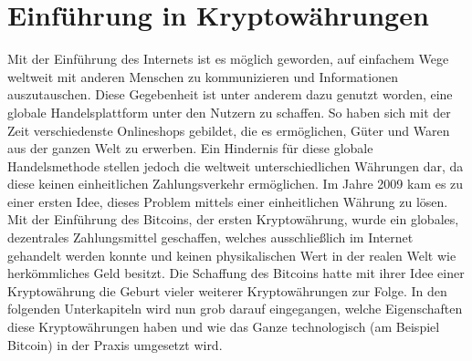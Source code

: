 \documentclass[12pt]{article}
\begin{document}
\part{Einführung in Kryptowährungen}
Mit der Einführung des Internets ist es möglich geworden, auf einfachem Wege weltweit mit anderen Menschen zu kommunizieren und Informationen auszutauschen. Diese Gegebenheit ist unter anderem dazu genutzt worden, eine globale Handelsplattform unter den Nutzern zu schaffen. So haben sich mit der Zeit verschiedenste Onlineshops gebildet, die es ermöglichen, Güter und Waren aus der ganzen Welt zu erwerben. Ein Hindernis für diese globale Handelsmethode stellen jedoch die weltweit unterschiedlichen Währungen dar, da diese keinen einheitlichen Zahlungsverkehr ermöglichen. Im Jahre 2009 kam es zu einer ersten Idee, dieses Problem mittels einer einheitlichen Währung zu lösen. Mit der Einführung des Bitcoins, der ersten Kryptowährung, wurde ein globales, dezentrales Zahlungsmittel geschaffen, welches ausschließlich im Internet gehandelt werden konnte und keinen physikalischen Wert in der realen Welt wie herkömmliches Geld besitzt. Die Schaffung des Bitcoins hatte mit ihrer Idee einer Kryptowährung die Geburt vieler weiterer Kryptowährungen zur Folge. In den folgenden Unterkapiteln wird nun grob darauf eingegangen, welche Eigenschaften diese Kryptowährungen haben und wie das Ganze technologisch (am Beispiel Bitcoin) in der Praxis umgesetzt wird.
\end{document}

